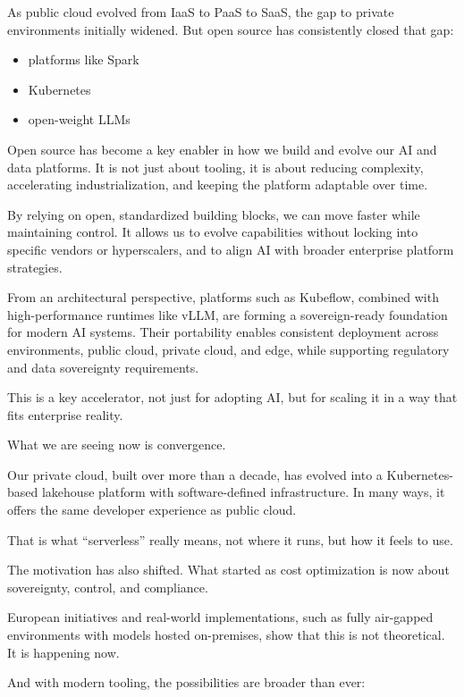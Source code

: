 \documentclass[11pt]{article}
\begin{document}
As public cloud evolved from IaaS to PaaS to SaaS, the gap to private environments initially widened. But open source has consistently closed that gap:

\begin{itemize}
\item platforms like Spark
\item Kubernetes
\item open-weight LLMs
\end{itemize}

Open source has become a key enabler in how we build and evolve our AI and data platforms. It is not just about tooling, it is about reducing complexity, accelerating industrialization, and keeping the platform adaptable over time.

By relying on open, standardized building blocks, we can move faster while maintaining control. It allows us to evolve capabilities without locking into specific vendors or hyperscalers, and to align AI with broader enterprise platform strategies.

\begin{sloppypar}
From an architectural perspective, platforms such as Kubeflow, combined with high-performance runtimes like vLLM, are forming a sovereign-ready foundation for modern AI systems. Their portability enables consistent deployment across environments, public cloud, private cloud, and edge, while supporting regulatory and data sovereignty requirements.
\end{sloppypar}

This is a key accelerator, not just for adopting AI, but for scaling it in a way that fits enterprise reality.

What we are seeing now is convergence.

Our private cloud, built over more than a decade, has evolved into a Kubernetes-based lakehouse platform with software-defined infrastructure. In many ways, it offers the same developer experience as public cloud.

That is what “serverless” really means, not where it runs, but how it feels to use.

The motivation has also shifted. What started as cost optimization is now about sovereignty, control, and compliance.

European initiatives and real-world implementations, such as fully air-gapped environments with models hosted on-premises, show that this is not theoretical. It is happening now.

And with modern tooling, the possibilities are broader than ever:
\end{document}
